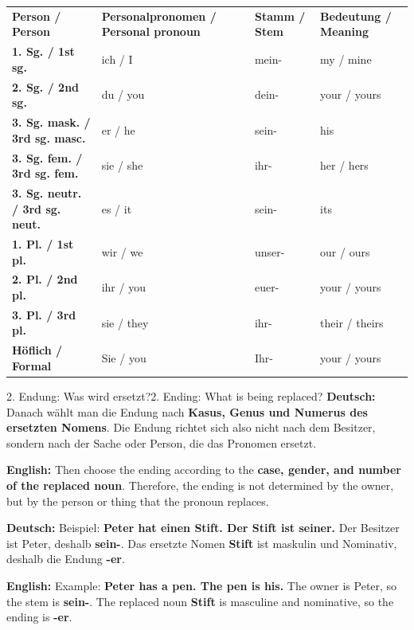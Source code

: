 \documentclass[a4paper,11pt]{article}
\newcommand{\GermanText}[1]{\textbf{Deutsch: }#1\par}
\newcommand{\EnglishText}[1]{{\small\color{SoftGray}\textbf{English: }#1\par}}
\begin{document}
        \begin{longtable}{>{\bfseries}p{3.0cm}|p{3.4cm}|p{3.5cm}|p{4.5cm}}
            \rowcolor{HeaderBlueDark}
            \color{white}\textbf{Person / Person} &
            \color{white}\textbf{Personalpronomen / Personal pronoun} &
            \color{white}\textbf{Stamm / Stem} &
            \color{white}\textbf{Bedeutung / Meaning} \\
            1. Sg. / 1st sg. & ich / I & mein- & my / mine \\
            2. Sg. / 2nd sg. & du / you & dein- & your / yours \\
            3. Sg. mask. / 3rd sg. masc. & er / he & sein- & his \\
            3. Sg. fem. / 3rd sg. fem. & sie / she & ihr- & her / hers \\
            3. Sg. neutr. / 3rd sg. neut. & es / it & sein- & its \\
            1. Pl. / 1st pl. & wir / we & unser- & our / ours \\
            2. Pl. / 2nd pl. & ihr / you & euer- & your / yours \\
            3. Pl. / 3rd pl. & sie / they & ihr- & their / theirs \\
            Höflich / Formal & Sie / you & Ihr- & your / yours \\
        \end{longtable}

        \begin{grammarentry}{2. Endung: Was wird ersetzt?}{2. Ending: What is being replaced?}
            \GermanText{Danach wählt man die Endung nach \textbf{Kasus, Genus und Numerus des ersetzten Nomens}. Die Endung richtet sich also nicht nach dem Besitzer, sondern nach der Sache oder Person, die das Pronomen ersetzt.}
            \EnglishText{Then choose the ending according to the \textbf{case, gender, and number of the replaced noun}. Therefore, the ending is not determined by the owner, but by the person or thing that the pronoun replaces.}

            \GermanText{Beispiel: \textbf{Peter hat einen Stift. Der Stift ist seiner.} Der Besitzer ist Peter, deshalb \textbf{sein-}. Das ersetzte Nomen \textbf{Stift} ist maskulin und Nominativ, deshalb die Endung \textbf{-er}.}
            \EnglishText{Example: \textbf{Peter has a pen. The pen is his.} The owner is Peter, so the stem is \textbf{sein-}. The replaced noun \textbf{Stift} is masculine and nominative, so the ending is \textbf{-er}.}
        \end{grammarentry}
\end{document}
